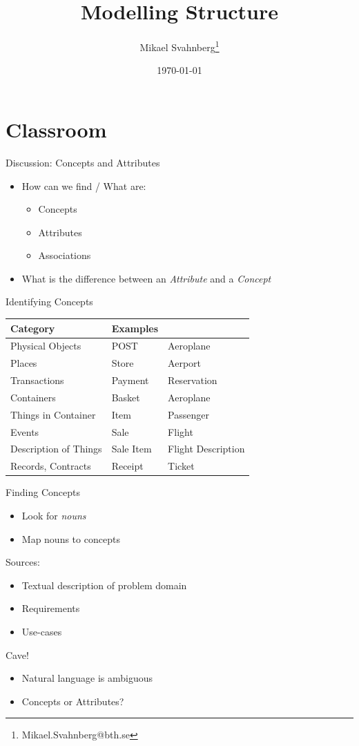 \documentclass[10pt,t,a4paper]{beamer}
\author{Mikael Svahnberg\thanks{Mikael.Svahnberg@bth.se}}
\date{\today}
\title{Modelling Structure}
\begin{document}
\maketitle

\section{Classroom}
\label{sec:org4671b3d}
\begin{frame}[label={sec:orgc4aa964}]{Discussion: Concepts and Attributes}
\begin{itemize}
\item How can we find / What are:
\begin{itemize}
\item Concepts
\item Attributes
\item Associations
\end{itemize}
\item What is the difference between an \emph{Attribute} and a \emph{Concept}
\end{itemize}
\end{frame}
\begin{frame}[label={sec:org82f981b}]{Identifying Concepts}
\begin{center}
\begin{tabular}{lll}
Category & Examples & \\
\hline
Physical Objects & POST & Aeroplane\\
Places & Store & Aerport\\
Transactions & Payment & Reservation\\
Containers & Basket & Aeroplane\\
Things in Container & Item & Passenger\\
Events & Sale & Flight\\
Description of Things & Sale Item & Flight Description\\
Records, Contracts & Receipt & Ticket\\
\hline
\end{tabular}
\end{center}
\end{frame}
\begin{frame}[label={sec:orgabba7ae}]{Finding Concepts}
\begin{itemize}
\item Look for \emph{nouns}
\item Map nouns to concepts
\end{itemize}

Sources:     
\begin{itemize}
\item Textual description of problem domain
\item Requirements
\item Use-cases
\end{itemize}

Cave!
\begin{itemize}
\item Natural language is ambiguous
\item Concepts or Attributes?
\end{itemize}
\end{frame}
\end{document}
